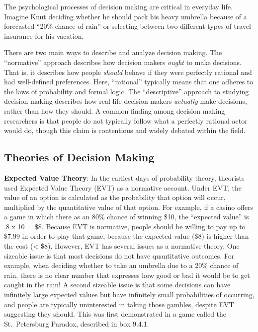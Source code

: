 \documentclass[
]{krantz}
\begin{document}
The psychological processes of decision making are critical in everyday life. Imagine Knut deciding whether he should pack his heavy umbrella because of a forecasted ``20\% chance of rain'' or selecting between two different types of travel insurance for his vacation.

There are two main ways to describe and analyze decision making. The ``normative'' approach describes how decision makers \emph{ought} to make decisions. That is, it describes how people \emph{should} behave if they were perfectly rational and had well-defined preferences. Here, ``rational'' typically means that one adheres to the laws of probability and formal logic. The ``descriptive'' approach to studying decision making describes how real-life decision makers \emph{actually} make decisions, rather than how they should. A common finding among decision making researchers is that people do not typically follow what a perfectly rational actor would do, though this claim is contentious and widely debated within the field.

\hypertarget{theories-of-decision-making}{%
\subsection*{Theories of Decision Making}\label{theories-of-decision-making}}


\textbf{Expected Value Theory}: In the earliest days of probability theory, theorists used Expected Value Theory (EVT) as a normative account. Under EVT, the value of an option is calculated as the probability that option will occur, multiplied by the quantitative value of that option. For example, if a casino offers a game in which there as an 80\% chance of winning \$10, the ``expected value'' is .8 x 10 = \$8. Because EVT is normative, people should be willing to pay up to \$7.99 in order to play that game, because the expected value (\$8) is higher than the cost (\textless{} \$8). However, EVT has several issues as a normative theory. One sizeable issue is that most decisions do not have quantitative outcomes. For example, when deciding whether to take an umbrella due to a 20\% chance of rain, there is no clear number that expresses how good or bad it would be to get caught in the rain! A second sizeable issue is that some decisions can have infinitely large expected values but have infinitely small probabilities of occurring, and people are typically uninterested in taking those gambles, despite EVT suggesting they should. This was first demonstrated in a game called the St.~Petersburg Paradox, described in box 9.4.1.
\end{document}
